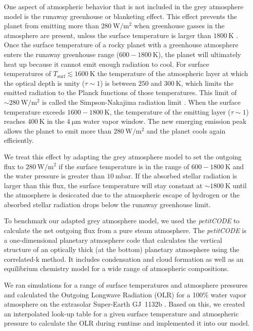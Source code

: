 \documentclass[paper=letterpaper,fontsize=12pt,oneside,twocolumn]{article}
\newcommand{\petit}{\textit{petitCODE}}
\begin{document}
One aspect of atmospheric behavior that is not included in the grey atmosphere model is the runaway greenhouse or blanketing effect. This effect prevents the planet from emitting more than $\SI{280}{\watt\per\square\metre}$ when greenhouse gasses in the atmosphere are present, unless the surface temperature is larger than $\SI{1800}{\kelvin}$ \citep{Goldblatt2013, Kopparapu2013}.
Once the surface temperature of a rocky planet with a greenhouse atmosphere enters the runaway greenhouse range ($600-\SI{1800}{\kelvin}$), the planet will ultimately heat up because it cannot emit enough radiation to cool.
For surface temperatures of $T_\mathrm{surf} \lesssim \SI{1600}{\kelvin}$ the temperature of the atmospheric layer at which the optical depth is unity ($\tau \sim 1$) is between $250$ and $\SI{300}{\kelvin}$, which limits the emitted radiation to the Planck functions of those temperatures.
This limit of $\sim \SI{280}{\watt\per\square\metre}$ is called the Simpson-Nakajima radiation limit \citep{Simpson1928, Nakajima1992}.
When the surface temperature exceeds $1600 - \SI{1800}{\kelvin}$, the temperature of the emitting layer ($\tau \sim 1$) reaches $\SI{400}{\kelvin}$ in the $\SI{4}{\micro\metre}$ water vapor window.
The new emerging emission peak allows the planet to emit more than $\SI{280}{\watt\per\square\metre}$ and the planet cools again efficiently.

We treat this effect by adapting the grey atmosphere model to set the outgoing flux to $\SI{280}{\watt\per\square\metre}$ if the surface temperature is in the range of $600-\SI{1800}{\kelvin}$ and the water pressure is greater than $\SI{10}{\milli\bar}$.
If the absorbed stellar radiation is larger than this flux, the surface temperature will stay constant at $\sim \SI{1800}{\kelvin}$ until the atmosphere is desiccated due to the atmospheric escape of hydrogen or the absorbed stellar radiation drops below the runaway greenhouse limit.

To benchmark our adapted grey atmosphere model, we used the \petit{} \citep{Molliere2015,Molliere2017} to calculate the net outgoing flux from a pure steam atmosphere.
The \petit{} is a one-dimensional planetary atmosphere code that calculates the vertical structure of an optically thick (at the bottom) planetary atmosphere using the correlated-k method.
It includes condensation and cloud formation as well as an equilibrium chemistry model for a wide range of atmospheric compositions.

We ran simulations for a range of surface temperatures and atmosphere pressures and calculated the Outgoing Longwave Radiation (OLR) for a 100\% water vapor atmosphere on the extrasolar Super-Earth GJ~1132b \citep{Berta-Thompson2015}. Based on this, we created an interpolated look-up table for a given surface temperature and atmospheric pressure to calculate the OLR during runtime and implemented it into our model.
\end{document}
